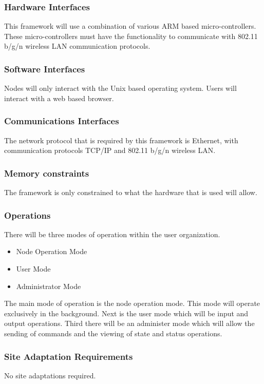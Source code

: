 \documentclass[draftclsnofoot, onecolumn, compsoc, 10pt]{IEEEtran}
\begin{document}
\subsubsection{Hardware Interfaces}
This framework will use a combination of various ARM based micro-controllers. These micro-controllers must have the functionality to communicate with 802.11 b/g/n wireless LAN communication protocols.

\subsubsection{Software Interfaces}
Nodes will only interact with the Unix based operating system. Users will interact with a web based browser.

\subsubsection{Communications Interfaces}
The network protocol that is required by this framework is Ethernet, with communication protocols TCP/IP and 802.11 b/g/n wireless LAN.

\subsubsection{Memory constraints}
The framework is only constrained to what the hardware that is used will allow.
 
\subsubsection{Operations}
There will be three modes of operation within the user organization. 
\begin{itemize}
\item Node Operation Mode \\
\item User Mode \\ 
\item Administrator Mode
\end{itemize}
The main mode of operation is the node operation mode. This mode will operate exclusively in the background. Next is the user mode which will be input and output operations. Third there will be an administer mode which will allow the sending of commands and the viewing of state and status operations.

\subsubsection{Site Adaptation Requirements}
No site adaptations required.
\end{document}
